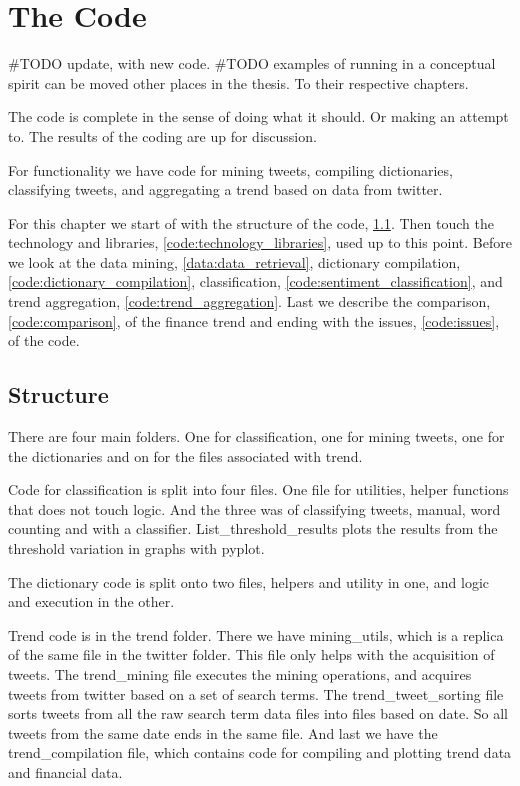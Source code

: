 \chapter{The Code}\label{code}

#TODO update, with new code. 
#TODO examples of running in a conceptual spirit can be moved other places in the
thesis. To their respective chapters. 

The code is complete in the sense of doing what it should. Or making an attempt
to. The results of the coding are up for discussion.

For functionality we have code for mining tweets, compiling dictionaries,
classifying tweets, and aggregating a trend based on data from twitter.  

For this chapter we start of with the structure of the code,
\ref{code:structure}. Then touch the technology and libraries,
\ref{code:technology_libraries}, used up to this point. Before we look at the
data mining, \ref{data:data_retrieval}, dictionary compilation,
\ref{code:dictionary_compilation}, classification,
\ref{code:sentiment_classification}, and trend aggregation,
\ref{code:trend_aggregation}. Last we describe the comparison,
\ref{code:comparison}, of the finance trend and ending with the issues,
\ref{code:issues}, of the code.  

\section{Structure}\label{code:structure}
There are four main folders. One for classification, one for mining tweets, one
for the dictionaries and on for the files associated with trend. 

Code for classification is split into four files. One file for utilities,
helper functions that does not touch logic. And the three was of classifying
tweets, manual, word counting and with a classifier. List\_threshold\_results
plots the results from the threshold variation in graphs with pyplot. 

The dictionary code is split onto two files, helpers and utility in one, and
logic and execution in the other. 

Trend code is in the trend folder. There we have mining\_utils, which is a
replica of the same file in the twitter folder. This file only helps with the
acquisition of tweets. The trend\_mining file executes the mining operations,
and acquires tweets from twitter based on a set of search terms. The
trend\_tweet\_sorting file sorts tweets from all the raw search term data files
into files based on date. So all tweets from the same date ends in the same
file. And last we have the trend\_compilation file, which contains code for
compiling and plotting trend data and financial data.  

